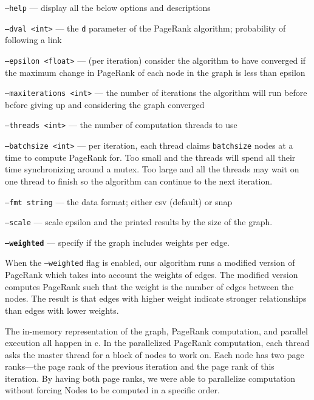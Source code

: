 \documentclass[draft]{report}
\newcommand{\pagerank}{PageRank }
\begin{document}
\begin{list}{}{}
  \item \texttt{--help} --- display all the below options and descriptions
  \item \texttt{--dval <int>} --- the \texttt{d} parameter of the \pagerank
  algorithm; probability of following a link
  \item \texttt{--epsilon <float>} --- (per iteration) consider the algorithm to
  have converged if the maximum change in \pagerank of each node in the graph is
  less than epsilon
  \item \texttt{--maxiterations <int>} --- the number of iterations the algorithm
  will run before before giving up and considering the graph converged
  \item \texttt{--threads <int>} --- the number of computation threads to use
  \item \texttt{--batchsize <int>} --- per iteration, each thread claims
  \texttt{batchsize} nodes at a time to compute \pagerank for. Too small and the
  threads will spend all their time synchronizing around a mutex. Too large and
  all the threads may wait on one thread to finish so the algorithm can continue
  to the next iteration.
  \item \texttt{--fmt string} --- the data format; either csv (default) or snap
  \item \texttt{--scale} --- scale epsilon and the printed results by the size of
  the graph.
  \item \textbf{\texttt{--weighted}} --- specify if the graph includes weights per
  edge.
\end{list}

When the \texttt{--weighted} flag is enabled, our algorithm runs a modified
version of \pagerank which takes into account the weights of edges. The modified
version computes \pagerank such that the weight is the number of edges between
the nodes. The result is that edges with higher weight indicate stronger
relationships than edges with lower weights.

The in-memory representation of the graph, \pagerank computation, and parallel
execution all happen in c. In the parallelized \pagerank computation, each thread
asks the master thread for a block of nodes to work on. Each node has two page
ranks---the page rank of the previous iteration and the page rank of this
iteration.  By having both page ranks, we were able to parallelize computation
without forcing Nodes to be computed in a specific order.
\end{document}
